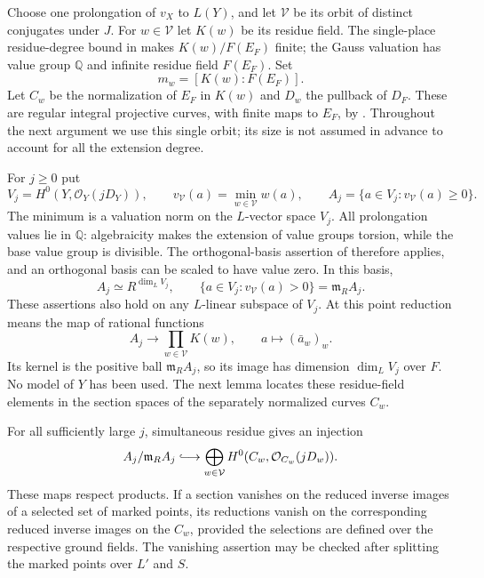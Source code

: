 Choose one prolongation of $v_X$ to $L(Y)$, and let $\mathcal V$ be its
orbit of distinct conjugates under $J$. For $w\in\mathcal V$ let $K(w)$
be its residue field. The single-place residue-degree bound in
 makes $K(w)/F(E_F)$ finite; the Gauss
valuation has value group $\mathbb Q$ and infinite residue field $F(E_F)$.
Set
\[
 m_w=[K(w):F(E_F)].
\]
Let $C_w$ be the normalization of $E_F$ in $K(w)$ and $D_w$ the pullback
of $D_F$. These are regular integral projective curves, with finite
maps to $E_F$, by .
Throughout the next argument we use this single orbit; its size is not
assumed in advance to account for all the extension degree.

For $j\geq0$ put
\[
 V_j=H^0(Y,\mathcal O_Y(jD_Y)),\qquad
 v_{\mathcal V}(a)=\min_{w\in\mathcal V}w(a),\qquad
 A_j=\{a\in V_j:v_{\mathcal V}(a)\geq0\}.
\]
The minimum is a valuation norm on the $L$-vector space $V_j$.
All prolongation values lie in $\mathbb Q$: algebraicity makes the
extension of value groups torsion, while the base value group is
divisible. The orthogonal-basis assertion of 
therefore applies, and an orthogonal basis can be scaled to have value
zero. In this basis,
\begin{equation}\label{eq:section-lattice}
 A_j\simeq R^{\dim_L V_j},\qquad
 \{a\in V_j:v_{\mathcal V}(a)>0\}=\mathfrak m_R A_j.
\end{equation}
These assertions also hold on any $L$-linear subspace of $V_j$.
At this point reduction means the map of rational functions
\[
 A_j\longrightarrow\prod_{w\in\mathcal V}K(w),
 \qquad a\longmapsto(\bar a_w)_w.
\]
Its kernel is the positive ball $\mathfrak m_R A_j$, so its image
has dimension $\dim_L V_j$ over $F$. No model of $Y$ has been used.
The next lemma locates these residue-field elements in the section
spaces of the separately normalized curves $C_w$.

\begin{lemma}\label{lem:section-specialization}
For all sufficiently large $j$, simultaneous residue gives an injection
\begin{equation}\label{eq:section-reduction}
 A_j/\mathfrak m_R A_j
 \lhook\joinrel\longrightarrow
 \bigoplus_{w\in\mathcal V}
 H^0(C_w,\mathcal O_{C_w}(jD_w)).
\end{equation}
These maps respect products. If a section vanishes on the reduced
inverse images of a selected set of marked points, its reductions
vanish on the corresponding reduced inverse images on the $C_w$,
provided the selections are defined over the respective ground fields.
The vanishing assertion may be checked after splitting the marked
points over $L'$ and $S$.
\end{lemma}

